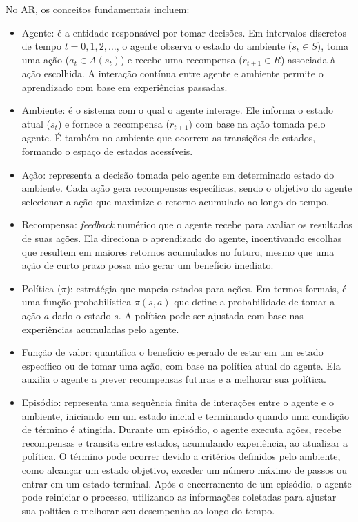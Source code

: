 \documentclass[
    12pt,                %
    openright,           %
    oneside,             %
    a4paper,             %
    english,             %
    spanish,             %
    brazil               %
]{ufscar}
\begin{document}
No AR, os conceitos fundamentais incluem:

\begin{itemize}
    \item {Agente}: é a entidade responsável por tomar decisões. Em intervalos discretos de tempo \(t = 0, 1, 2, \dots\), o agente observa o estado do ambiente (\(s_t \in S\)), toma uma ação (\(a_t \in A(s_t)\)) e recebe uma recompensa (\(r_{t+1} \in R\)) associada à ação escolhida. A interação contínua entre agente e ambiente permite o aprendizado com base em experiências passadas.
    
    \item {Ambiente}: é o sistema com o qual o agente interage. Ele informa o estado atual (\(s_t\)) e fornece a recompensa (\(r_{t+1}\)) com base na ação tomada pelo agente. É também no ambiente que ocorrem as transições de estados, formando o espaço de estados acessíveis.
    
    \item {Ação}: representa a decisão tomada pelo agente em determinado estado do ambiente. Cada ação gera recompensas específicas, sendo o objetivo do agente selecionar a ação que maximize o retorno acumulado ao longo do tempo.
    
    \item {Recompensa}: \textit{feedback} numérico que o agente recebe para avaliar os resultados de suas ações. Ela direciona o aprendizado do agente, incentivando escolhas que resultem em maiores retornos acumulados no futuro, mesmo que uma ação de curto prazo possa não gerar um benefício imediato.
    
    \item {Política (\(\pi\))}: estratégia que mapeia estados para ações. Em termos formais, é uma função probabilística \(\pi(s, a)\) que define a probabilidade de tomar a ação \(a\) dado o estado \(s\). A política pode ser ajustada com base nas experiências acumuladas pelo agente.
    
    \item {Função de valor}: quantifica o benefício esperado de estar em um estado específico ou de tomar uma ação, com base na política atual do agente. Ela auxilia o agente a prever recompensas futuras e a melhorar sua política.

    \item {Episódio}: representa uma sequência finita de interações entre o agente e o ambiente, iniciando em um estado inicial e terminando quando uma condição de término é atingida. Durante um episódio, o agente executa ações, recebe recompensas e transita entre estados, acumulando experiência, ao atualizar a política. O término pode ocorrer devido a critérios definidos pelo ambiente, como alcançar um estado objetivo, exceder um número máximo de passos ou entrar em um estado terminal. Após o encerramento de um episódio, o agente pode reiniciar o processo, utilizando as informações coletadas para ajustar sua política e melhorar seu desempenho ao longo do tempo.

\end{itemize}
\end{document}
